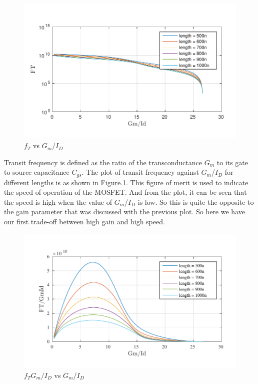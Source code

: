 \begin{figure} [H]
\centering
\includegraphics[scale=1]{Figures/Misc/PDFs/nmos_len_gmidft.pdf}
\caption{$f_T$ vs $G_m$/$I_D$}
\label{fig:gmidft}
\end{figure}

Transit frequency is defined as the ratio of the transconductance $G_m$ to its gate to source capacitance $C_{gs}$. The plot of transit frequency against $G_m$/$I_D$ for different lengths is as shown in Figure.\ref{fig:gmidft}. This figure of merit is used to indicate the speed of operation of the MOSFET. And from the plot, it can be seen that the speed is high when the value of $G_m$/$I_D$ is low. So this is quite the opposite to the gain parameter that was discussed with the previous plot. So here we have our first trade-off between high gain and high speed.

\begin{figure} [H]
\centering
\includegraphics[scale=1]{Figures/Misc/PDFs/nmos_len_gmidftgmid.pdf}
\caption{$f_TG_m/I_D$ vs $G_m$/$I_D$}
\label{fig:gmidftgmid}
\end{figure}

